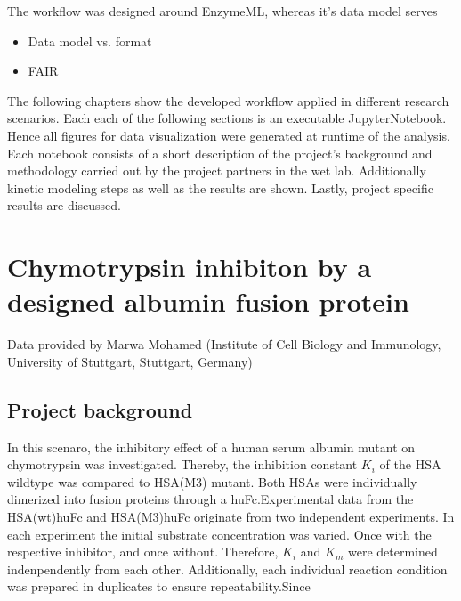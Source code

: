 \documentclass[letterpaper,10pt,english]{jupyterBook}
\begin{document}
\sphinxAtStartPar
The workflow was designed around EnzymeML, whereas it’s data model serves
\begin{itemize}
\item {} 
\sphinxAtStartPar
Data model vs. format

\item {} 
\sphinxAtStartPar
FAIR

\end{itemize}

\sphinxAtStartPar
The following chapters show the developed workflow applied in different research scenarios. Each each of the following sections is an executable JupyterNotebook. Hence all figures for data visualization were generated at runtime of the analysis.
Each notebook consists of a short description of the project’s background and methodology carried out by the project partners in the wet lab. Additionally kinetic modeling steps as well as the results are shown. Lastly, project specific results are discussed.

\sphinxstepscope


\section{Chymotrypsin inhibiton by a designed albumin fusion protein}
\label{\detokenize{scenarios/chymotrypsin_inhibition:scenario-a-br-chymotrypsin-inhibiton-by-a-designed-albumin-fusion-protein}}\label{\detokenize{scenarios/chymotrypsin_inhibition::doc}}
\sphinxAtStartPar
Data provided by Marwa Mohamed (Institute of Cell Biology and Immunology, University of Stuttgart, Stuttgart, Germany)


\subsection{Project background}
\label{\detokenize{scenarios/chymotrypsin_inhibition:project-background}}
\sphinxAtStartPar
In this scenaro, the inhibitory effect of a human serum albumin mutant on chymotrypsin was investigated. Thereby, the inhibition constant \(K_{i}\) of the HSA wild\sphinxhyphen{}type was compared to HSA(M3) mutant. Both HSAs were individually dimerized into fusion proteins through a huFc.Experimental data from the HSA(wt)\sphinxhyphen{}huFc and HSA(M3)\sphinxhyphen{}huFc originate from two independent experiments. In each experiment the initial substrate concentration was varied. Once with the respective inhibitor, and once without. Therefore, \(K_{i}\) and \(K_{m}\) were determined indenpendently from each other. Additionally, each individual reaction condition was prepared in duplicates to ensure repeatability.Since
\end{document}
